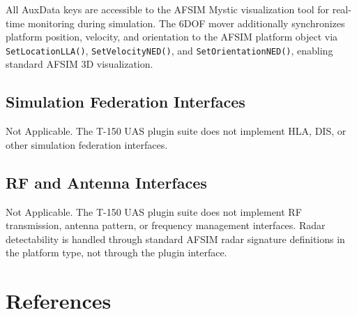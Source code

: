 \unclass All AuxData keys are accessible to the AFSIM Mystic visualization tool for real-time monitoring during simulation. The 6DOF mover additionally synchronizes platform position, velocity, and orientation to the AFSIM platform object via \texttt{SetLocationLLA()}, \texttt{SetVelocityNED()}, and \texttt{SetOrientationNED()}, enabling standard AFSIM 3D visualization.

\subsection{\unclass Simulation Federation Interfaces}

\unclass Not Applicable. The T-150 UAS plugin suite does not implement HLA, DIS, or other simulation federation interfaces.

\subsection{\unclass RF and Antenna Interfaces}

\unclass Not Applicable. The T-150 UAS plugin suite does not implement RF transmission, antenna pattern, or frequency management interfaces. Radar detectability is handled through standard AFSIM radar signature definitions in the platform type, not through the plugin interface.

\pagebreak


\section{\unclass References}

